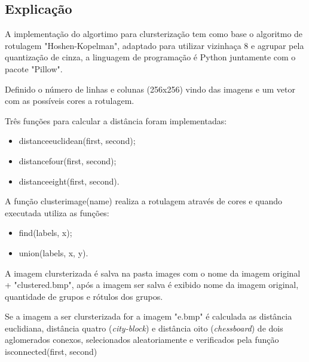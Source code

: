 \documentclass{article}
\begin{document}
\subsection{Explicação}

\begin{flushleft}
A implementação do algortimo para clursterização tem como base o algoritmo de rotulagem "Hoshen-Kopelman", adaptado para utilizar vizinhaça 8 e agrupar pela quantização de cinza, a linguagem de programação é Python juntamente com o pacote "Pillow".
\end{flushleft}

\begin{flushleft}
Definido o número de linhas e colunas (256x256) vindo das imagens e um vetor com as possíveis cores a rotulagem.
\end{flushleft}

\begin{flushleft}
Três funções para calcular a distância foram implementadas:
\end{flushleft}

\begin{itemize}
    \item {\ttfamily distance\textunderscore euclidean(first, second)};
    \item {\ttfamily distance\textunderscore four(first, second)};
    \item {\ttfamily distance\textunderscore eight(first, second)}.
\end{itemize}

\begin{flushleft}
A função {\ttfamily cluster\textunderscore image(name)} realiza a rotulagem através de cores e quando executada utiliza as funções:
\end{flushleft}

\begin{itemize}
   \item {\ttfamily find(labels, x)};
   \item {\ttfamily union(labels, x, y)}.
 \end{itemize}

\begin{flushleft}
A imagem clursterizada é salva na pasta images com o nome da imagem original + "\textunderscore clustered.bmp", após a imagem ser salva é exibido nome da imagem original, quantidade de grupos e rótulos dos grupos. 
\end{flushleft}

\begin{flushleft}
Se a imagem a ser clursterizada for a imagem "e.bmp" é calculada as distância euclidiana, distância quatro (\textit{city-block}) e distância oito (\textit{chessboard}) de dois aglomerados conexos, selecionados aleatoriamente e verificados pela função {\ttfamily is\textunderscore connected(first, second)}
\end{flushleft}
\end{document}
